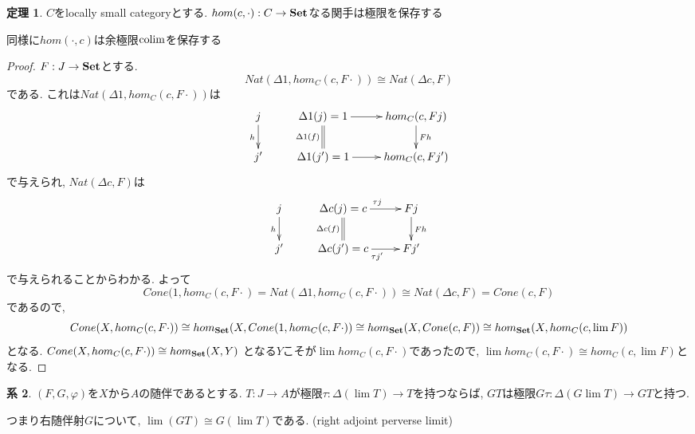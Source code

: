 \documentclass[dvipdfmx,a4paper,11pt]{report}
\newcommand{\colim}{{\rm colim}}
\theoremstyle{definition}
\newtheorem{thm}{定理}
\newtheorem{cor}[thm]{系}
\begin{document}
 \begin{tcolorbox}
 [colback = white, colframe = green!35!black, fonttitle = \bfseries,breakable = true]
\begin{thm}
$C$をlocally small categoryとする. 
$hom (c , \cdot ) : C \to {\bf Set}$なる関手は極限を保存する
\end{thm}
\end{tcolorbox}
同様に$hom ( \cdot, c)$は余極限$\colim$を保存する
\begin{proof}
$F: J \to {\bf Set}$とする. 
$$
Nat(\Delta  1, hom_{C}(c, F\cdot))
\cong
Nat(\Delta c, F)
$$
である.
これは$Nat(\Delta  1, hom_{C}(c, F\cdot))$は
\begin{equation*}
\xymatrix@C=25pt@R=20pt{
j\ar@{->}[d]_{h}&\Delta 1(j)=1\ar@{=}[d]_{\Delta 1(f)}  \ar@{->}[r] & hom_{C}(c, Fj)\ar@{->}[d]^{Fh} \\
j'&\Delta 1(j')=1\ar@{->}[r]  &  hom_{C}(c, Fj')\\   
}
\end{equation*}
で与えられ, $Nat(\Delta c, F)$は
\begin{equation*}
\xymatrix@C=25pt@R=20pt{
j\ar@{->}[d]_{h}&\Delta c(j)=c\ar@{=}[d]_{\Delta c(f)}  \ar@{->}[r]^{\tau j} & Fj\ar@{->}[d]^{Fh} \\
j'&\Delta c(j')=c\ar@{->}[r]_{\tau j'} & Fj'\\   
}
\end{equation*}
で与えられることからわかる. 
よって
$$
Cone(1, hom_{C}(c, F\cdot)
=
Nat(\Delta  1, hom_{C}(c, F\cdot))
\cong
Nat(\Delta c, F)
=
Cone(c,F)
$$
であるので,
$$
Cone(X,hom_{C}(c, F\cdot)) \cong
hom_{{\bf Set}} (X, Cone(1, hom_{C}(c, F\cdot))\cong 
hom_{{\bf Set}} (X, Cone(c,F)) \cong
hom_{{\bf Set}} (X, hom_{C}(c, \lim F))
$$
となる.
$Cone(X,hom_{C}(c, F\cdot)) \cong hom_{{\bf Set}} (X, Y)$
となる$Y$こそが$\lim hom_{C}(c, F \cdot)$であったので, 
$\lim hom_{C}(c, F\cdot) \cong hom_{C}(c, \lim F)$となる. 
\end{proof}

 \begin{tcolorbox}
 [colback = white, colframe = green!35!black, fonttitle = \bfseries,breakable = true]
\begin{cor}
$(F,G,\varphi)$を$X$から$A$の随伴であるとする. 
$T : J \to A$が極限$\tau : \Delta (\lim T) \to T$を持つならば, 
$GT$は極限$G\tau : \Delta (G \lim T) \to GT$と持つ.

つまり右随伴射$G$について, $\lim (GT) \cong G(\lim T)$である.
(right adjoint perverse limit)
\end{cor}
\end{tcolorbox}
\end{document}
